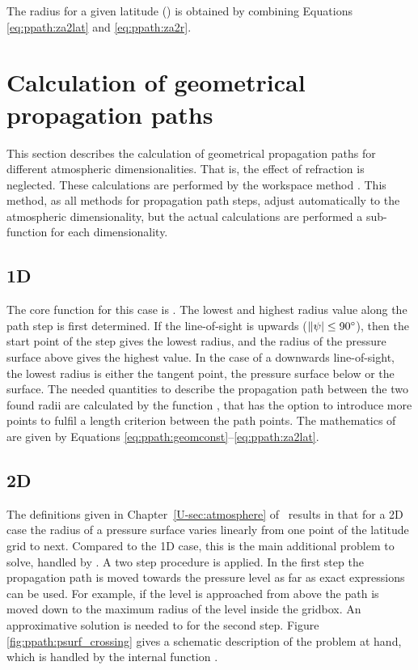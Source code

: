 The radius for a given latitude ()
is obtained by combining Equations \ref{eq:ppath:za2lat} and
\ref{eq:ppath:za2r}.



\section{Calculation of geometrical propagation paths}
\label{sec:ppath:stepcalc}

This section describes the calculation of geometrical propagation
paths for different atmospheric dimensionalities. That is, the effect
of refraction is neglected. These calculations are performed by the
workspace method . This method, as all
methods for propagation path steps, adjust automatically to the
atmospheric dimensionality, but the actual calculations are performed
a sub-function for each dimensionality.


\subsection{1D}
\label{sec:ppath:1Dgeom}

The core function for this case is . The
lowest and highest radius value along the path step is first
determined. If the line-of-sight is upwards ($\|\psi| \leq
90^\circ$), then the start point of the step gives the lowest radius,
and the radius of the pressure surface above gives the highest value.
In the case of a downwards line-of-sight, the lowest radius is either
the tangent point, the pressure surface below or the surface. The
needed quantities to describe the propagation path between the two
found radii are calculated by the function
, that has the option to
introduce more points to fulfil a length criterion between the path
points. The mathematics of  are
given by Equations \ref{eq:ppath:geomconst}--\ref{eq:ppath:za2lat}.


\subsection{2D}
\label{sec:ppath:2Dgeom}

The definitions given in Chapter~\ref{U-sec:atmosphere} of \user\ results in
that for a 2D case the radius of a pressure surface varies linearly from one
point of the latitude grid to next. Compared to the 1D case, this is the main
additional problem to solve, handled by . A two
step procedure is applied. In the first step the propagation path is moved
towards the pressure level as far as exact expressions can be used. For
example, if the level is approached from above the path is moved down to the
maximum radius of the level inside the gridbox. An approximative solution is
needed to for the second step. Figure \ref{fig:ppath:psurf_crossing} gives a
schematic description of the problem at hand, which is handled by the internal
function .

